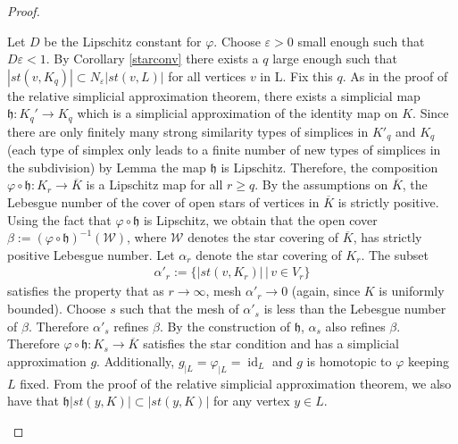 \documentclass[a4paper,11pt]{article}
\theoremstyle{definition}
\theoremstyle{plain}
\theoremstyle{remark}
\DeclareMathOperator{\id}{id}
\begin{document}
{\begin{proof}
\begin{enumerate}
Let $D$ be the Lipschitz constant for $\varphi$. Choose $\varepsilon>0$ small enough such that $D\varepsilon<1$. By Corollary \ref{starconv} there exists a $q$ large enough such that $|st(v,K_{q})|\subset N_{\varepsilon} |st(v,L)|$ for all vertices $v$ in L. Fix this $q$. As in the proof of the relative simplicial approximation theorem, there exists a simplicial map $\mathfrak{h}:K_{q}'\rightarrow K_{q}$ which is a simplicial approximation of the identity map on $K$. Since there are only finitely many strong similarity types of simplices in $K'_{q}$ and $K_{q}$ (each type of simplex only leads to a finite number of new types of simplices  in the subdivision) by Lemma \label{Lbound} the map $\mathfrak{h}$ is Lipschitz. Therefore, the composition $\varphi\circ \mathfrak{h}: K_{r}\rightarrow \overline{K}$ is a Lipschitz map for all $r\geq q$. By the assumptions on $\overline{K}$, the Lebesgue number of the cover of open stars of vertices in $\overline{K}$ is strictly positive.  Using the fact that $\varphi\circ \mathfrak{h}$ is Lipschitz, we obtain that the open cover $\beta:=(\varphi\circ \mathfrak{h})^{-1}(\mathcal{W})$, where $\mathcal{W}$ denotes the star covering of $\overline{K}$, has strictly positive Lebesgue number. Let $\alpha_{r}$ denote the star covering of $K_{r}$. The subset 
\begin{align*}
\alpha'_r:= \{|st(v,K_r)| \,|\, v\in V_r\}
\end{align*}
satisfies the property that as $r \rightarrow \infty$, mesh $\alpha'_r\rightarrow 0$ (again, since $K$ is uniformly bounded). Choose $s$ such that the mesh of $\alpha'_s$ is less than the Lebesgue number of $\beta$. Therefore $\alpha'_s$ refines $\beta$. By the construction of $\mathfrak{h}$, $\alpha_{s}$ also refines $\beta$. \\

Therefore $\varphi\circ \mathfrak{h}: K_{s}\rightarrow \overline{K}$ satisfies the star condition and has a simplicial approximation $g$. Additionally, $g_{|L} = \varphi_{|L} = \id_{L}$  and $g$ is homotopic to $\varphi$ keeping $L$ fixed. From the proof of the relative simplicial approximation theorem, we also have that $\mathfrak{h}|st(y,K)|\subset |st(y,K)|$ for any vertex $y\in L$. \\


\end{enumerate}
\end{proof}}
\end{document}
